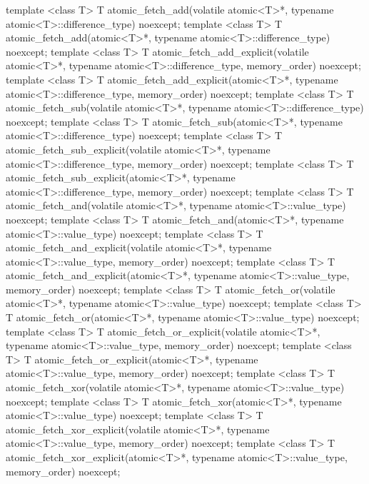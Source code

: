 \begin{codeblock}
{  template <class T>
    T atomic_fetch_add(volatile atomic<T>*, typename atomic<T>::difference_type) noexcept;
  template <class T>
    T atomic_fetch_add(atomic<T>*, typename atomic<T>::difference_type) noexcept;
  template <class T>
    T atomic_fetch_add_explicit(volatile atomic<T>*, typename atomic<T>::difference_type,
                                memory_order) noexcept;
  template <class T>
    T atomic_fetch_add_explicit(atomic<T>*, typename atomic<T>::difference_type,
                                memory_order) noexcept;
  template <class T>
    T atomic_fetch_sub(volatile atomic<T>*, typename atomic<T>::difference_type) noexcept;
  template <class T>
    T atomic_fetch_sub(atomic<T>*, typename atomic<T>::difference_type) noexcept;
  template <class T>
    T atomic_fetch_sub_explicit(volatile atomic<T>*, typename atomic<T>::difference_type,
                                memory_order) noexcept;
  template <class T>
    T atomic_fetch_sub_explicit(atomic<T>*, typename atomic<T>::difference_type,
                                memory_order) noexcept;
  template <class T>
    T atomic_fetch_and(volatile atomic<T>*, typename atomic<T>::value_type) noexcept;
  template <class T>
    T atomic_fetch_and(atomic<T>*, typename atomic<T>::value_type) noexcept;
  template <class T>
    T atomic_fetch_and_explicit(volatile atomic<T>*, typename atomic<T>::value_type,
                                memory_order) noexcept;
  template <class T>
    T atomic_fetch_and_explicit(atomic<T>*, typename atomic<T>::value_type,
                                memory_order) noexcept;
  template <class T>
    T atomic_fetch_or(volatile atomic<T>*, typename atomic<T>::value_type) noexcept;
  template <class T>
    T atomic_fetch_or(atomic<T>*, typename atomic<T>::value_type) noexcept;
  template <class T>
    T atomic_fetch_or_explicit(volatile atomic<T>*, typename atomic<T>::value_type,
                               memory_order) noexcept;
  template <class T>
    T atomic_fetch_or_explicit(atomic<T>*, typename atomic<T>::value_type,
                               memory_order) noexcept;
  template <class T>
    T atomic_fetch_xor(volatile atomic<T>*, typename atomic<T>::value_type) noexcept;
  template <class T>
    T atomic_fetch_xor(atomic<T>*, typename atomic<T>::value_type) noexcept;
  template <class T>
    T atomic_fetch_xor_explicit(volatile atomic<T>*, typename atomic<T>::value_type,
                                memory_order) noexcept;
  template <class T>
    T atomic_fetch_xor_explicit(atomic<T>*, typename atomic<T>::value_type,
                                memory_order) noexcept;

}
\end{codeblock}
